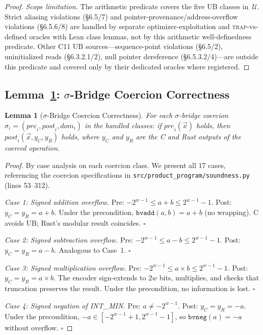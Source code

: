 \documentclass[10pt,a4paper]{article}
\newtheorem{lemma}[theorem]{Lemma}
\begin{document}
\begin{appendices}
\begin{proof}
\emph{Scope limitation.}
The arithmetic predicate covers the five UB classes in~$\mathcal{U}$.
Strict aliasing violations (\S6.5/7) and pointer-provenance/address-overflow
violations (\S6.5.6/8) are handled by separate optimizer-exploitation and
\textsc{trap}-vs-defined oracles with Lean class lemmas, not by this arithmetic
well-definedness predicate.  Other C11 UB sources---sequence-point violations
(\S6.5/2), uninitialized reads (\S6.3.2.1/2), null pointer dereference
(\S6.5.3.2/4)---are outside this predicate and covered only by their dedicated
oracles where registered.
\end{proof}

\subsection{Lemma~\ref{lem:sigma-correct}: $\sigma$-Bridge Coercion
Correctness}

\begin{lemma}[$\sigma$-Bridge Coercion Correctness]\label{lem:sigma-correct}
For each $\sigma$-bridge coercion
$\sigma_i = (\mathit{pre}_i, \mathit{post}_i, \mathit{dom}_i)$ in
the handled classes: if $\mathit{pre}_i(\vec{x})$ holds, then
$\mathit{post}_i(\vec{x}, y_C, y_R)$ holds, where $y_C$ and $y_R$
are the C and Rust outputs of the coerced operation.
\end{lemma}

\begin{proof}
By case analysis on each coercion class.  We present all 17 cases,
referencing the coercion specifications in
\texttt{src/product\_program/soundness.py} (lines 53--312).

\emph{Case 1: Signed addition overflow.}
Pre: $-2^{w-1} \leq a + b \leq 2^{w-1}-1$.
Post: $y_C = y_R = a + b$.
Under the precondition, $\texttt{bvadd}(a,b) = a + b$ (no wrapping).
C avoids UB; Rust's modular result coincides.  $\square$

\emph{Case 2: Signed subtraction overflow.}
Pre: $-2^{w-1} \leq a - b \leq 2^{w-1}-1$.
Post: $y_C = y_R = a - b$.
Analogous to Case~1.  $\square$

\emph{Case 3: Signed multiplication overflow.}
Pre: $-2^{w-1} \leq a \times b \leq 2^{w-1}-1$.
Post: $y_C = y_R = a \times b$.
The encoder sign-extends to $2w$ bits, multiplies, and checks that
truncation preserves the result.  Under the precondition, no
information is lost.  $\square$

\emph{Case 4: Signed negation of INT\_MIN.}
Pre: $a \neq -2^{w-1}$.
Post: $y_C = y_R = -a$.
Under the precondition, $-a \in [-2^{w-1}+1, 2^{w-1}-1]$, so
$\texttt{bvneg}(a) = -a$ without overflow.  $\square$


\end{proof}
\end{appendices}
\end{document}
